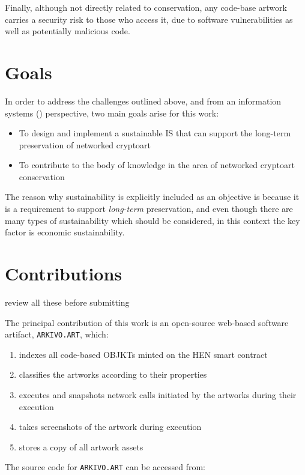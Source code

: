 Finally, although not directly related to conservation, any code-base artwork carries a security risk to those who access it, due to software vulnerabilities as well as potentially malicious code.

\section{Goals}

In order to address the challenges outlined above, and from an information systems () perspective, two main goals arise for this work:

\begin{itemize}
	\item To design and implement a sustainable IS that can support the long-term preservation of networked cryptoart
	\item To contribute to the body of knowledge in the area of networked cryptoart conservation
\end{itemize}

The reason why sustainability is explicitly included as an objective is because it is a requirement to support \emph{long-term} preservation, and even though there are many types of sustainability which should be considered, in this context the key factor is economic sustainability.

\section{Contributions}

\todo  review all these before submitting

The principal contribution of this work is an open-source web-based software artifact, \texttt{ARKIVO.ART}, which:

\begin{enumerate}
	\item indexes all code-based OBJKTs minted on the HEN smart contract
	\item classifies the artworks according to their properties
	\item executes and snapshots network calls initiated by the artworks during their execution
	\item takes screenshots of the artwork during execution
	\item stores a copy of all artwork assets
\end{enumerate}

The source code for \texttt{ARKIVO.ART} can be accessed from:

